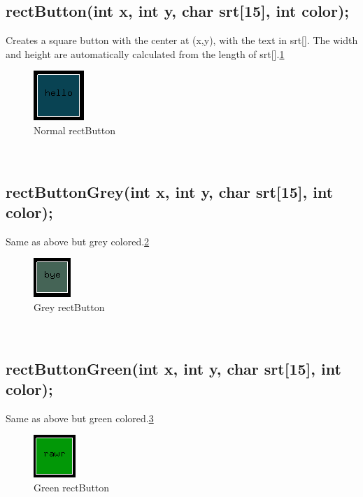 \documentclass{article}
\begin{document}
\subsection{rectButton(int x, int y, char srt[15], int color);}
Creates a square button with the center at (x,y), with the text in srt[]. The width and height are automatically calculated from the length of srt[].\ref{rectbutton}\\
\begin{figure}[htp]
  \begin{center}
\includegraphics[]{rectbutton}
  \end{center}
  \caption{Normal rectButton}
\label{rectbutton}
\end{figure}\\

\subsection{rectButtonGrey(int x, int y, char srt[15], int color);}
Same as above but grey colored.\ref{rectbuttongrey}\\
\begin{figure}[htp]
  \begin{center}
\includegraphics[]{rectbuttongrey}
  \end{center}
  \caption{Grey rectButton}
\label{rectbuttongrey}
\end{figure}\\

\subsection{rectButtonGreen(int x, int y, char srt[15], int color);}
Same as above but green colored.\ref{rectbuttongreen}\\
\begin{figure}[htp]
  \begin{center}
\includegraphics[]{rectbuttongreen}
  \end{center}
  \caption{Green rectButton}
\label{rectbuttongreen}
\end{figure}\\
\end{document}
